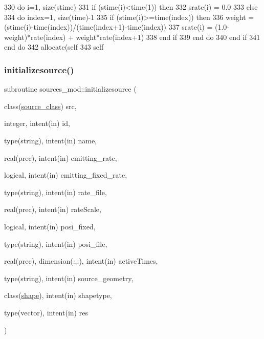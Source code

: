 \begin{DoxyCode}
330     \textcolor{keywordflow}{do} i=1, \textcolor{keyword}{size}(stime)
331         \textcolor{keywordflow}{if} (stime(i)<time(1)) \textcolor{keywordflow}{then}
332             srate(i) = 0.0
333         \textcolor{keywordflow}{else}
334             \textcolor{keywordflow}{do} index=1, \textcolor{keyword}{size}(time)-1
335                 \textcolor{keywordflow}{if} (stime(i)>=time(index)) \textcolor{keywordflow}{then}
336                     weight = (stime(i)-time(index))/(time(index+1)-time(index))
337                     srate(i) = (1.0-weight)*rate(index) + weight*rate(index+1)
338 \textcolor{keywordflow}{                end if}
339 \textcolor{keywordflow}{            end do}
340 \textcolor{keywordflow}{        end if}
341 \textcolor{keywordflow}{    end do}
342     \textcolor{keyword}{allocate}(self%
343     self%
\end{DoxyCode}
\mbox{\label{namespacesources__mod_abbddcd8606c9bf9463ffe6eaf1e9cbfd}} 
\subsubsection{\texorpdfstring{initializesource()}{initializesource()}}
{\footnotesize\ttfamily subroutine sources\+\_\+mod\+::initializesource (\begin{DoxyParamCaption}\item[{class(\mbox{\hyperlink{structsources__mod_1_1source__class}{source\+\_\+class}})}]{src,  }\item[{integer, intent(in)}]{id,  }\item[{type(string), intent(in)}]{name,  }\item[{real(prec), intent(in)}]{emitting\+\_\+rate,  }\item[{logical, intent(in)}]{emitting\+\_\+fixed\+\_\+rate,  }\item[{type(string), intent(in)}]{rate\+\_\+file,  }\item[{real(prec), intent(in)}]{rate\+Scale,  }\item[{logical, intent(in)}]{posi\+\_\+fixed,  }\item[{type(string), intent(in)}]{posi\+\_\+file,  }\item[{real(prec), dimension(\+:,\+:), intent(in)}]{active\+Times,  }\item[{type(string), intent(in)}]{source\+\_\+geometry,  }\item[{class(\mbox{\hyperlink{structgeometry__mod_1_1shape}{shape}}), intent(in)}]{shapetype,  }\item[{type(vector), intent(in)}]{res }\end{DoxyParamCaption})\hspace{0.3cm}{\ttfamily [private]}}



